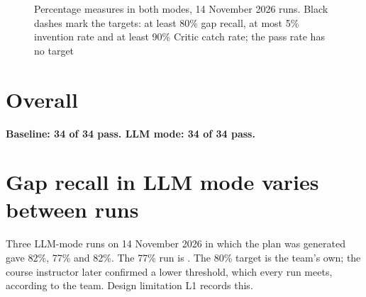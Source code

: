 \begin{figure}[htbp]
\centering

\caption{Percentage measures in both modes, 14 November 2026 runs. Black dashes mark the targets: at least 80\% gap recall, at most 5\% invention rate and at least 90\% Critic catch rate; the pass rate has no target}
\label{fig:measures}
\end{figure}

\section{Overall}
\textbf{Baseline: 34 of 34 pass. LLM mode: 34 of 34 pass.}

\section{Gap recall in LLM mode varies between runs}
Three LLM-mode runs on 14 November 2026 in which the plan was generated gave 82\%, 77\% and 82\%. The 77\% run is . The 80\% target is the team's own; the course instructor later confirmed a lower threshold, which every run meets, according to the team. Design limitation L1 records this.
